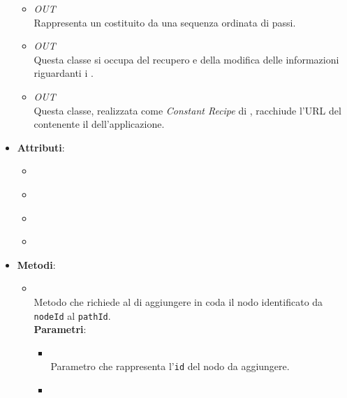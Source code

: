 \begin{itemize}
\begin{itemize}
\item \textit{OUT} \hyperref[\nogloxy{Premi::Front-End::Model::Path}]{}\\
Rappresenta un  costituito da una sequenza ordinata di passi.
\item \textit{OUT} \hyperref[\nogloxy{Premi::Front-End::Services::ProjectService}]{}\\
Questa classe si occupa del recupero e della modifica delle informazioni riguardanti i .
\item \textit{OUT} \hyperref[\nogloxy{Premi::Front-End::Services::ServerURL}]{}\\
Questa classe, realizzata come \textit{Constant Recipe} di , racchiude l'URL del  contenente il  dell'applicazione.
\end{itemize}
\item \textbf{Attributi}:
\begin{itemize}
\item {}
\\ \dpProjectServiceField
\item {}
\\ \dpConstantServiceField
\item {}
\\ \dpHttpField
\item {}
\\ \dpQField
\end{itemize}
\item \textbf{Metodi}:
\begin{itemize}
\item {}
\\ Metodo che richiede al  di aggiungere in coda il nodo identificato da \texttt{nodeId} al  \texttt{pathId}.
\\ \textbf{Parametri}:
\begin{itemize}
\item {}
\\ Parametro che rappresenta l'\texttt{id} del nodo da aggiungere.
\item {}

\end{itemize}
\end{itemize}
\end{itemize}
